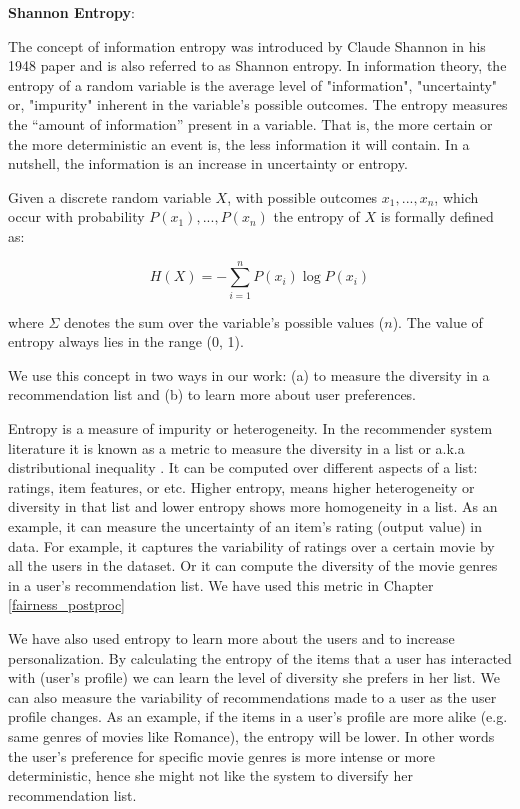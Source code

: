         \textbf{Shannon Entropy}:
        
        The concept of information entropy was introduced by Claude Shannon in his 1948 paper \cite{entropy1948} and is also referred to as Shannon entropy. In information theory, the entropy of a random variable is the average level of "information", "uncertainty" or, "impurity" inherent in the variable's possible outcomes. The entropy measures the “amount of information” present in a variable. That is, the more certain or the more deterministic an event is, the less information it will contain. In a nutshell, the information is an increase in uncertainty or entropy. 
        
        Given a discrete random variable $X$, with possible outcomes $x_{1},...,x_{n}$, which occur with probability $P(x_1),...,P(x_n)$
         the entropy of $X$ is formally defined as:
         
         \begin{equation}
            H(X)=-\sum_{i=1}^{n}P(x_{i})\log P(x_{i})
         \end{equation}

        where $\Sigma$ denotes the sum over the variable's possible values ($n$). The value of entropy always lies in the range (0, 1).
        
        We use this concept in two ways in our work: (a) to measure the diversity in a recommendation list and (b) to learn more about user preferences.
        
        Entropy is a measure of impurity or heterogeneity. In the recommender system literature it is known as a metric to measure the diversity in a list or a.k.a distributional inequality . It can be computed over different aspects of a list: ratings, item features, or etc.
        Higher entropy, means higher heterogeneity or diversity in that list and lower entropy shows more homogeneity in a list. As an example, it can measure the uncertainty of an item’s rating (output value) in data. For example, it captures the variability of ratings over a certain movie by all the users in the dataset. Or it can compute the diversity of the movie genres in a user's recommendation list. We have used this metric in Chapter \ref{fairness_postproc} 
        
        We have also used entropy to learn more about the users and to increase personalization. By calculating the entropy of the items that a user has interacted with (user's profile) we can learn the level of diversity she prefers in her list. We can also measure the variability of recommendations made to a user as the user profile changes. 
        As an example, if the items in a user's profile are more alike (e.g. same genres of movies like Romance), the entropy will be lower. In other words the user's preference for specific movie genres is more intense or more deterministic, hence she might not like the system to diversify her recommendation list.
        
